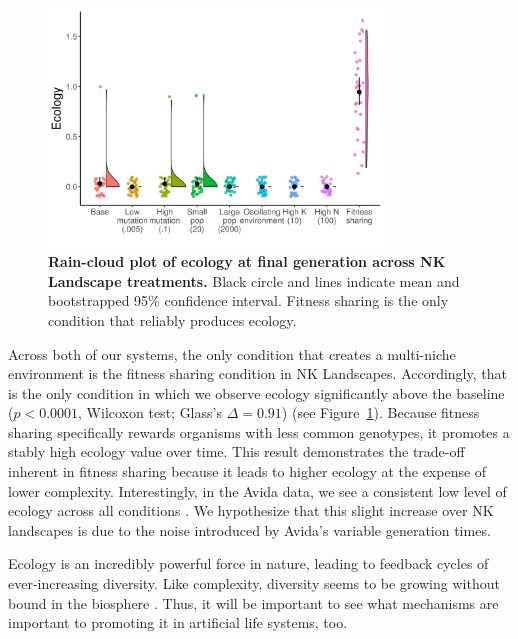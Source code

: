 \documentclass[letterpaper]{article}
\begin{document}
\begin{figure}
    \centering
\includegraphics[width=3.5in]{figs/dolson.ecologyboxplots.png}
\caption{\textbf{Rain-cloud plot of ecology at final generation across NK Landscape treatments.} Black circle and lines indicate mean and bootstrapped 95\% confidence interval. Fitness sharing is the only condition that reliably produces ecology.\label{ecology}}
\end{figure}

Across both of our systems, the only condition that creates a multi-niche environment is the fitness sharing condition in NK Landscapes. Accordingly, that is the only condition in which we observe ecology significantly above the baseline ($p<0.0001$, Wilcoxon test; Glass's $\Delta=0.91$) (see Figure~\ref{ecology}). Because fitness sharing specifically rewards organisms with less common genotypes, it promotes a stably high ecology value over time. This result demonstrates the trade-off inherent in fitness sharing because it leads to higher ecology at the expense of lower complexity. Interestingly, in the Avida data, we see a consistent low level of ecology across all conditions \citep{zenodo_dolson_data_2018}. We hypothesize that this slight increase over NK landscapes is due to the noise introduced by Avida's variable generation times. 

Ecology is an incredibly powerful force in nature, leading to feedback cycles of ever-increasing diversity. Like complexity, diversity seems to be growing without bound in the biosphere \citep{harmon_species_2015}. Thus, it will be important to see what mechanisms are important to promoting it in artificial life systems, too.
\end{document}
